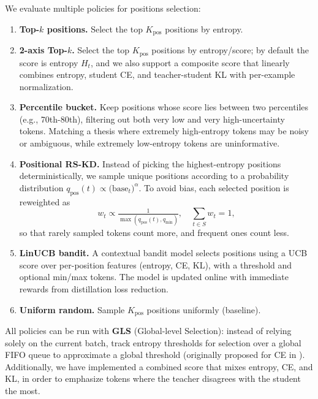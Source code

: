 \documentclass[11pt]{article}
\begin{document}
We evaluate multiple policies for positions selection:
\begin{enumerate}
	\item \textbf{Top-$k$ positions.} Select the top $K_{\text{pos}}$ positions by entropy.
	\item \textbf{2-axis Top-$k$.} Select the top $K_{\text{pos}}$ positions by entropy/score; by default the score is entropy $H_t$, and we also support a composite score that linearly combines entropy, student CE, and teacher-student KL with per-example normalization.
	\item \textbf{Percentile bucket.} Keep positions whose score lies between two percentiles (e.g., 70th-80th), filtering out both very low and very high-uncertainty tokens. Matching a thesis where extremely high-entropy tokens may be noisy or ambiguous, while extremely low-entropy tokens are uninformative.
	\item \textbf{Positional RS-KD.} Instead of picking the highest-entropy positions deterministically, we sample unique positions according to a probability distribution $q_{\text{pos}}(t)\propto \big(\text{base}_t\big)^{\alpha}$. To avoid bias, each selected position is reweighted as
	      \[
		      w_t \propto  \tfrac{1}{\max(q_{\text{pos}}(t),q_{\min})},\quad \sum_{t\in S}w_t=1,
	      \]
	      so that rarely sampled tokens count more, and frequent ones count less.
	\item \textbf{LinUCB bandit.} A contextual bandit model selects positions using a UCB score over per-position features (entropy, CE, KL), with a threshold and optional min/max tokens. The model is updated online with immediate rewards from distillation loss reduction.
	\item \textbf{Uniform random.} Sample $K_{\text{pos}}$ positions uniformly (baseline).
\end{enumerate}
All policies can be run with \textbf{GLS} (Global-level Selection): instead of relying solely on the current batch, track entropy thresholds for selection over a global FIFO queue to approximate a global threshold (originally proposed for CE in \citet{wang2021selectivekd}).
Additionally, we have implemented a combined score that mixes entropy, CE, and KL, in order to emphasize tokens where the teacher disagrees with the student the most.
\end{document}
